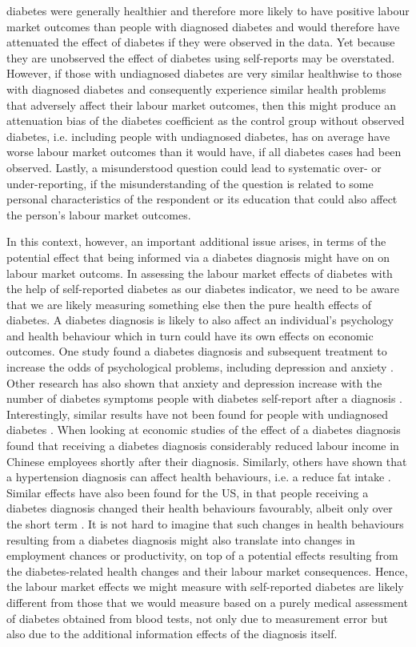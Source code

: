 diabetes were generally healthier and therefore more likely to have
positive labour market outcomes than people with diagnosed diabetes
and would therefore have attenuated the effect of diabetes if they
were observed in the data. Yet because they are unobserved the effect
of diabetes using self-reports may be overstated. However, if those
with undiagnosed diabetes are very similar healthwise to those with
diagnosed diabetes and consequently experience similar health problems
that adversely affect their labour market outcomes, then this might
produce an attenuation bias of the diabetes coefficient as the control
group without observed diabetes, i.e. including people with undiagnosed
diabetes, has on average have worse labour market outcomes than it
would have, if all diabetes cases had been observed. Lastly, a misunderstood
question could lead to systematic over- or under-reporting, if the
misunderstanding of the question is related to some personal characteristics
of the respondent or its education that could also affect the person's
labour market outcomes.

In this context, however, an important additional issue arises, in
terms of the potential effect that being informed via a diabetes diagnosis
might have on on labour market outcoms. In assessing the labour market
effects of diabetes with the help of self-reported diabetes as our
diabetes indicator, we need to be aware that we are likely measuring
something else then the pure health effects of diabetes. A diabetes
diagnosis is likely to also affect an individual's psychology and
health behaviour which in turn could have its own effects on economic
outcomes. One study found a diabetes diagnosis and subsequent treatment
to increase the odds of psychological problems, including depression
and anxiety \citep{17003303}. Other research has also shown that
anxiety and depression increase with the number of diabetes symptoms
people with diabetes self-report after a diagnosis \cite{Paddison_2011}.
Interestingly, similar results have not been found for people with
undiagnosed diabetes \cite{Nouwen_2011}. When looking at economic
studies of the effect of a diabetes diagnosis \citet{Liu2014} found
that receiving a diabetes diagnosis considerably reduced labour income
in Chinese employees shortly after their diagnosis. Similarly, others
have shown that a hypertension diagnosis can affect health
behaviours, i.e. a reduce fat intake \citep{Zhao2013a}. Similar effects have also been found
for the US, in that people receiving a diabetes diagnosis changed
their health behaviours favourably, albeit only over the short term
\citep{Slade2012}. It is not hard to imagine that such changes in
health behaviours resulting from a diabetes diagnosis might also translate
into changes in employment chances or productivity, on top of a potential
effects resulting from the diabetes-related health changes and their
labour market consequences. Hence, the labour market effects we might
measure with self-reported diabetes are likely different from those
that we would measure based on a purely medical assessment of diabetes
obtained from blood tests, not only due to measurement error but also
due to the additional information effects of the diagnosis itself.
